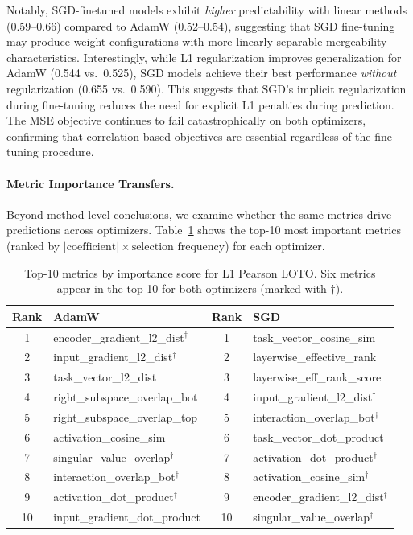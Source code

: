 Notably, SGD-finetuned models exhibit \emph{higher} predictability with linear methods (0.59--0.66) compared to AdamW (0.52--0.54), suggesting that SGD fine-tuning may produce weight configurations with more linearly separable mergeability characteristics. Interestingly, while L1 regularization improves generalization for AdamW (0.544 vs.\ 0.525), SGD models achieve their best performance \emph{without} regularization (0.655 vs.\ 0.590). This suggests that SGD's implicit regularization during fine-tuning reduces the need for explicit L1 penalties during prediction. The MSE objective continues to fail catastrophically on both optimizers, confirming that correlation-based objectives are essential regardless of the fine-tuning procedure.

\paragraph{Metric Importance Transfers.}
Beyond method-level conclusions, we examine whether the same metrics drive predictions across optimizers. Table~\ref{tab:sgd_adamw_metrics} shows the top-10 most important metrics (ranked by $|\text{coefficient}| \times \text{selection frequency}$) for each optimizer.

\begin{table}[h]
\centering
\caption{Top-10 metrics by importance score for L1 Pearson LOTO. Six metrics appear in the top-10 for both optimizers (marked with $\dagger$).}
\label{tab:sgd_adamw_metrics}
\begin{tabular}{clcl}
\toprule
\textbf{Rank} & \textbf{AdamW} & \textbf{Rank} & \textbf{SGD} \\
\midrule
1 & encoder\_gradient\_l2\_dist$^\dagger$ & 1 & task\_vector\_cosine\_sim \\
2 & input\_gradient\_l2\_dist$^\dagger$ & 2 & layerwise\_effective\_rank \\
3 & task\_vector\_l2\_dist & 3 & layerwise\_eff\_rank\_score \\
4 & right\_subspace\_overlap\_bot & 4 & input\_gradient\_l2\_dist$^\dagger$ \\
5 & right\_subspace\_overlap\_top & 5 & interaction\_overlap\_bot$^\dagger$ \\
6 & activation\_cosine\_sim$^\dagger$ & 6 & task\_vector\_dot\_product \\
7 & singular\_value\_overlap$^\dagger$ & 7 & activation\_dot\_product$^\dagger$ \\
8 & interaction\_overlap\_bot$^\dagger$ & 8 & activation\_cosine\_sim$^\dagger$ \\
9 & activation\_dot\_product$^\dagger$ & 9 & encoder\_gradient\_l2\_dist$^\dagger$ \\
10 & input\_gradient\_dot\_product & 10 & singular\_value\_overlap$^\dagger$ \\
\bottomrule
\end{tabular}
\end{table}

